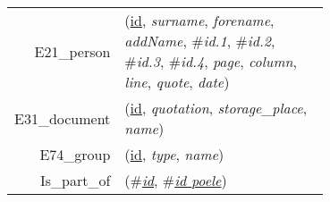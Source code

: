 
\usepackage[normalem]{ulem}
\newenvironment{mld}
  {\par\begin{minipage}{\linewidth}\begin{tabular}{rp{0.7\linewidth}}}
  {\end{tabular}\end{minipage}\par}
\newcommand{\relat}[1]{\textsc{#1}}
\newcommand{\attr}[1]{\emph{#1}}
\newcommand{\prim}[1]{\uline{#1}}
\newcommand{\foreign}[1]{\#\textsl{#1}}


\begin{mld}
  E21\_person & (\prim{id}, \attr{surname}, \attr{forename}, \attr{addName}, \foreign{id.1}, \foreign{id.2}, \foreign{id.3}, \foreign{id.4}, \attr{page}, \attr{column}, \attr{line}, \attr{quote}, \attr{date})\\
  E31\_document & (\prim{id}, \attr{quotation}, \attr{storage\_place}, \attr{name})\\
  E74\_group & (\prim{id}, \attr{type}, \attr{name})\\
  Is\_part\_of & (\foreign{\prim{id}}, \foreign{\prim{id poele}})\\
\end{mld}